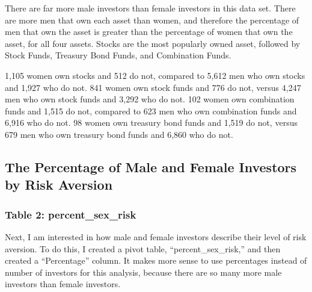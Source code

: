 \documentclass[
]{article}
\newenvironment{Shaded}{\begin{snugshade}}{\end{snugshade}}
\newcommand{\DataTypeTok}[1]{\textcolor[rgb]{0.13,0.29,0.53}{#1}}
\newcommand{\DecValTok}[1]{\textcolor[rgb]{0.00,0.00,0.81}{#1}}
\newcommand{\KeywordTok}[1]{\textcolor[rgb]{0.13,0.29,0.53}{\textbf{#1}}}
\newcommand{\NormalTok}[1]{#1}
\newcommand{\OperatorTok}[1]{\textcolor[rgb]{0.81,0.36,0.00}{\textbf{#1}}}
\newcommand{\StringTok}[1]{\textcolor[rgb]{0.31,0.60,0.02}{#1}}
\begin{document}
There are far more male investors than female investors in this data
set. There are more men that own each asset than women, and therefore
the percentage of men that own the asset is greater than the percentage
of women that own the asset, for all four assets. Stocks are the most
popularly owned asset, followed by Stock Funds, Treasury Bond Funds, and
Combination Funds.

1,105 women own stocks and 512 do not, compared to 5,612 men who own
stocks and 1,927 who do not. 841 women own stock funds and 776 do not,
versus 4,247 men who own stock funds and 3,292 who do not. 102 women own
combination funds and 1,515 do not, compared to 623 men who own
combination funds and 6,916 who do not. 98 women own treasury bond funds
and 1,519 do not, versus 679 men who own treasury bond funds and 6,860
who do not.

\hypertarget{the-percentage-of-male-and-female-investors-by-risk-aversion}{%
\subsection{The Percentage of Male and Female Investors by Risk
Aversion}\label{the-percentage-of-male-and-female-investors-by-risk-aversion}}

\hypertarget{table-2-percent_sex_risk}{%
\subsubsection{Table 2:
percent\_sex\_risk}\label{table-2-percent_sex_risk}}

Next, I am interested in how male and female investors describe their
level of risk aversion. To do this, I created a pivot table,
``percent\_sex\_risk,'' and then created a ``Percentage'' column. It
makes more sense to use percentages instead of number of investors for
this analysis, because there are so many more male investors than female
investors.

\begin{Shaded}
\end{Shaded}
\end{document}
